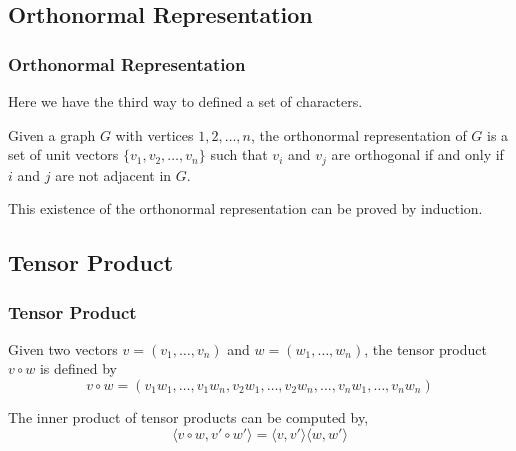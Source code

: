 \subsection{Orthonormal Representation}

      \begin{frame}
            \frametitle{Orthonormal Representation}

            Here we have the third way to defined a set of characters.

            \begin{definition}\label{def:orthonormalRepresentation}
                  Given a graph $ G $ with vertices $ 1,2,\dots,n $, the orthonormal representation of $ G $ is a set of unit vectors $ \{v_1, v_2, \dots, v_n\} $ such that $ v_i $ and $ v_j $ are orthogonal if and only if $ i $ and $ j $ are not adjacent in $ G $.
            \end{definition}

            \pause

            This existence of the orthonormal representation can be proved by induction.

      \end{frame}

\subsection{Tensor Product}

      \begin{frame}
            \frametitle{Tensor Product}
            \begin{definition}\label{def:tensorProduct}
                  Given two vectors $ v = \left(v_{1},\dots,v_{n}\right) $ and $ w = \left(w_{1},\dots,w_{n}\right) $, the tensor product $ v \circ w $ is defined by
                  \begin{equation}
                        v \circ w = \left(
                              v_{1}w_{1},\dots,v_{1}w_{n},
                              v_{2}w_{1},\dots,v_{2}w_{n},
                              \dots,
                              v_{n}w_{1},\dots,v_{n}w_{n}
                              \right)
                  \end{equation}
            \end{definition}

            \pause

            \begin{lemma}
                  The inner product of tensor products can be computed by,
                  \begin{equation}
                        \langle v \circ w, v' \circ w' \rangle = \langle v, v' \rangle \langle w, w' \rangle
                  \end{equation}
            \end{lemma}

      \end{frame}

